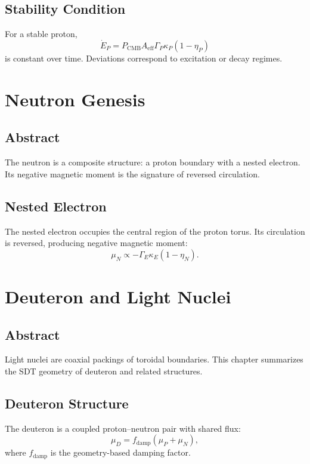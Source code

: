 \documentclass[12pt]{book}
\begin{document}
\section{Stability Condition}
For a stable proton,
\begin{equation}
\dot{E}_P = P_{\text{CMB}} A_{\text{eff}} \Gamma_P \kappa_P (1-\eta_P)
\end{equation}
is constant over time. Deviations correspond to excitation or decay regimes.

\chapter{Neutron Genesis}

\section*{Abstract}
The neutron is a composite structure: a proton boundary with a nested electron. Its negative magnetic
moment is the signature of reversed circulation.

\section{Nested Electron}
The nested electron occupies the central region of the proton torus. Its circulation is reversed,
producing negative magnetic moment:
\begin{equation}
\mu_N \propto -\Gamma_{E} \kappa_{E} (1-\eta_N).
\end{equation}

\chapter{Deuteron and Light Nuclei}

\section*{Abstract}
Light nuclei are coaxial packings of toroidal boundaries. This chapter summarizes the SDT geometry of
deuteron and related structures.

\section{Deuteron Structure}
The deuteron is a coupled proton--neutron pair with shared flux:
\begin{equation}
\mu_D = f_{\text{damp}}(\mu_P + \mu_N),
\end{equation}
where $f_{\text{damp}}$ is the geometry-based damping factor.
\end{document}
